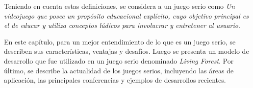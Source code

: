 Teniendo en cuenta estas definiciones, se considera a un juego serio como 
\emph{Un videojuego que posee un propósito educacional explícito, cuyo objetivo 
principal es el de educar y utiliza conceptos lúdicos para involucrar y entretener 
al usuario}. 

En este capítulo, para un mejor entendimiento de lo que es un juego serio, se describen sus características, ventajas y desafíos. Luego se presenta un modelo de desarrollo que fue utilizado en un juego serio denominado \textit{Living Forest}. Por último, se describe la actualidad de los juegos serios, incluyendo las áreas de aplicación, las principales conferencias y ejemplos de desarrollos recientes. 








